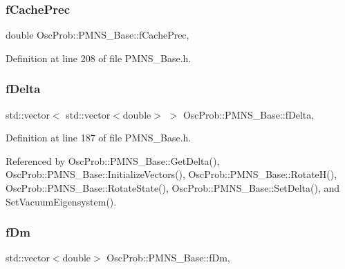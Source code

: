 \subsubsection{\texorpdfstring{f\+Cache\+Prec}{fCachePrec}}
{\footnotesize\ttfamily double Osc\+Prob\+::\+P\+M\+N\+S\+\_\+\+Base\+::f\+Cache\+Prec\hspace{0.3cm}{\ttfamily [protected]}, {\ttfamily [inherited]}}



Definition at line 208 of file P\+M\+N\+S\+\_\+\+Base.\+h.

\mbox{\label{classOscProb_1_1PMNS__Base_ab2a5fa40e689b221c8a7d2c17213810d}} 
\subsubsection{\texorpdfstring{f\+Delta}{fDelta}}
{\footnotesize\ttfamily std\+::vector$<$ std\+::vector$<$double$>$ $>$ Osc\+Prob\+::\+P\+M\+N\+S\+\_\+\+Base\+::f\+Delta\hspace{0.3cm}{\ttfamily [protected]}, {\ttfamily [inherited]}}



Definition at line 187 of file P\+M\+N\+S\+\_\+\+Base.\+h.



Referenced by Osc\+Prob\+::\+P\+M\+N\+S\+\_\+\+Base\+::\+Get\+Delta(), Osc\+Prob\+::\+P\+M\+N\+S\+\_\+\+Base\+::\+Initialize\+Vectors(), Osc\+Prob\+::\+P\+M\+N\+S\+\_\+\+Base\+::\+Rotate\+H(), Osc\+Prob\+::\+P\+M\+N\+S\+\_\+\+Base\+::\+Rotate\+State(), Osc\+Prob\+::\+P\+M\+N\+S\+\_\+\+Base\+::\+Set\+Delta(), and Set\+Vacuum\+Eigensystem().

\mbox{\label{classOscProb_1_1PMNS__Base_a406a31c3b5d620e5a0cace5b411f9f70}} 
\subsubsection{\texorpdfstring{f\+Dm}{fDm}}
{\footnotesize\ttfamily std\+::vector$<$double$>$ Osc\+Prob\+::\+P\+M\+N\+S\+\_\+\+Base\+::f\+Dm\hspace{0.3cm}{\ttfamily [protected]}, {\ttfamily [inherited]}}



